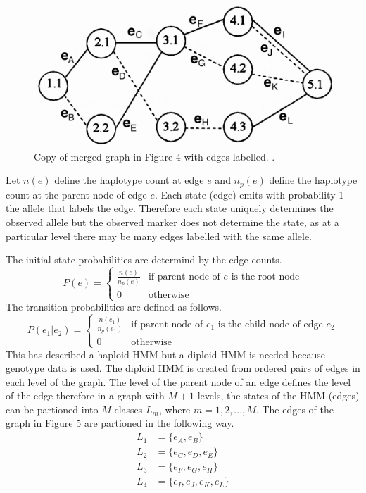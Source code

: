 \documentclass[a4paper,11pt,twoside,abstraction,titlepage]{article}
\begin{document}
\begin{figure}[htp!]
\begin{center}
\centerline{\includegraphics[scale=0.08]{fig5}}
\caption{Copy of merged graph in Figure 4 with edges labelled. \cite{beagle1}.}
\end{center}
\vspace{-20pt}
\end{figure}

Let $n(e)$ define the haplotype count at edge $e$ and $n_p(e)$ define the haplotype count at the parent node of edge $e$.  Each state (edge) emits with probability 1 the allele that labels the edge.  Therefore each state uniquely determines the observed allele but the observed marker does not determine the state, as at a particular level there may be many edges labelled with the same allele.

The initial state probabilities are determind by the edge counts.  
\begin{equation*}
P(e) = 
\begin{cases}
\frac{n(e)}{n_p(e)} & \mbox{if parent node of $e$ is the root node} \\
0  & \mbox{otherwise}
\end{cases}
\end{equation*}
The transition probabilities are defined as follows.
\begin{equation*}
P(e_1|e_2) = 
\begin{cases}
\frac{n(e_1)}{n_p(e_1)} & \mbox{if parent node of $e_1$ is the child node of edge $e_2$} \\
0  & \mbox{otherwise}
\end{cases}
\end{equation*}
This has described a haploid HMM but a diploid HMM is needed because genotype data is used.  The diploid HMM is created from ordered pairs of edges in each level of the graph.  The level of the parent node of an edge defines the level of the edge therefore in a graph with $M+1$ levels, the states of the HMM (edges) can be partioned into $M$ classes $L_m$, where $m=1,2,...,M$.  The edges of the graph in Figure 5 are partioned in the following way.
\vspace{-10pt}
\begin{align*}
L_1 &= \{e_{A}, e_{B}\} \\
L_2 &= \{e_{C}, e_{D}, e_{E}\}\\
L_3 &= \{e_{F}, e_{G}, e_{H}\} \\
L_4 &= \{e_{I}, e_{J}, e_{K}, e_{L}\}
\end{align*}
\end{document}
